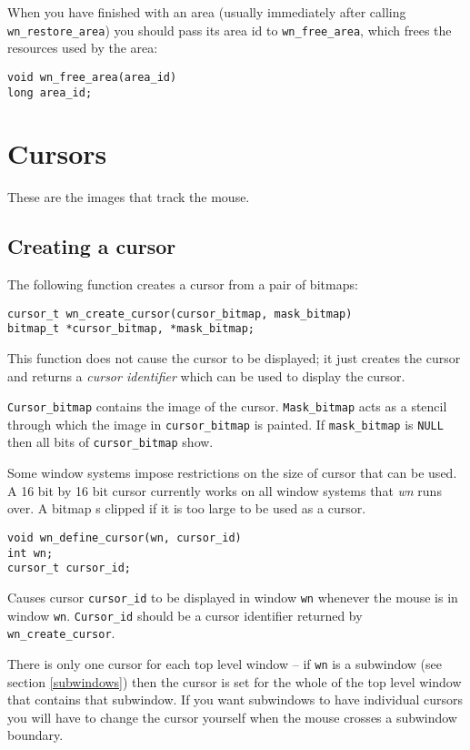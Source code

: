 When you have finished with an area (usually immediately after calling
{\tt wn\_restore\_area}) you should pass its area id to {\tt wn\_free\_area},
which frees the resources used by the area:
\begin{verbatim}
void wn_free_area(area_id)
long area_id;
\end{verbatim}
\section{Cursors}
These are the images that track the mouse.
\subsection{Creating a cursor}
\label{setcurs}
The following function creates a cursor from a pair of bitmaps:
\begin{verbatim}
cursor_t wn_create_cursor(cursor_bitmap, mask_bitmap)
bitmap_t *cursor_bitmap, *mask_bitmap;
\end{verbatim}
This function does not cause the cursor to be displayed; it just
creates the cursor and returns a {\em cursor identifier} which
can be used to display the cursor.

{\tt Cursor\_bitmap} contains the image of the cursor.
{\tt Mask\_bitmap} acts as a stencil through which the image in
{\tt cursor\_bitmap} is painted.  If {\tt mask\_bitmap} is {\tt NULL}
then all bits of {\tt cursor\_bitmap} show.

Some window systems impose restrictions on the size of cursor that can be used.
A 16 bit by 16 bit cursor currently works on all window systems that {\em wn}
runs over.
A bitmap s clipped if it is too large to be used as a cursor.

\begin{verbatim}
void wn_define_cursor(wn, cursor_id)
int wn;
cursor_t cursor_id;
\end{verbatim}
Causes cursor {\tt cursor\_id} to be displayed in window {\tt wn}
whenever the mouse is in window {\tt wn}.
{\tt Cursor\_id} should be a cursor identifier returned by
{\tt wn\_create\_cursor}.

There is only one cursor for each top level window -- if {\tt wn}
is a subwindow (see section \ref{subwindows}) then the cursor is
set for the whole of the top level window that contains that
subwindow.
If you want subwindows to have individual cursors you will have to
change the cursor yourself when the mouse crosses a subwindow
boundary.

